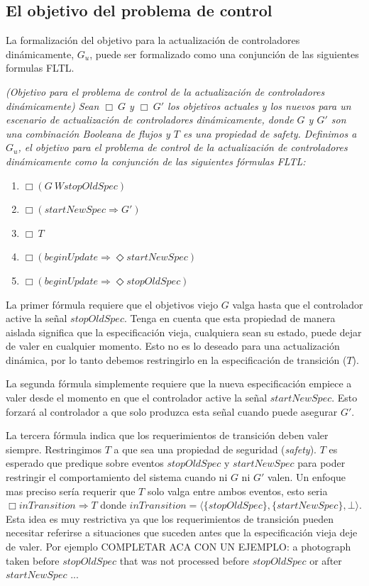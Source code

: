 \subsection{El objetivo del problema de control}

La formalización del objetivo para la actualización de controladores dinámicamente, $G_u$, puede ser formalizado
como una conjunción de las siguientes formulas FLTL.

\begin{nahaDef}
\label{update_goals_def}
\emph{(Objetivo para el problema de control de la actualización de controladores dinámicamente) Sean $\Box\ G$ y $\Box\ G'$
los objetivos actuales y los nuevos para un escenario de actualización de controladores dinámicamente, donde $G$ y $G'$
son una combinación Booleana de flujos y $T$ es una propiedad de safety. Definimos a $G_u$, el objetivo para el
problema de control de la actualización de controladores dinámicamente como la conjunción de las siguientes fórmulas
FLTL:}

\begin{enumerate}
\itemsep-4mm
\item $\Box(G\ W stopOldSpec)$
\item $\Box(startNewSpec \Longrightarrow G')$
\item $\Box\ T$
\item $\Box(beginUpdate \Longrightarrow \Diamond startNewSpec)$
\item $\Box(beginUpdate \Longrightarrow \Diamond stopOldSpec)$
\end{enumerate}
\end{nahaDef}

La primer fórmula requiere que el objetivos viejo $G$ valga hasta que el controlador active la señal $stopOldSpec$.
Tenga en cuenta que esta propiedad de manera aislada significa que la especificación vieja, cualquiera sean su estado,
puede dejar de valer en cualquier momento. Esto no es lo deseado para una actualización dinámica, por lo tanto debemos
restringirlo en la especificación de transición ($T$).

La segunda fórmula simplemente requiere que la nueva especificación empiece a valer desde el momento en que el
controlador active la señal $startNewSpec$. Esto forzará al controlador a que solo produzca esta señal cuando puede
asegurar $G'$.

La tercera fórmula indica que los requerimientos de transición deben valer siempre. Restringimos $T$ a que sea una
propiedad de seguridad (\emph{safety}). $T$ es esperado que predique sobre eventos $stopOldSpec$ y $startNewSpec$ para
poder restringir el comportamiento del sistema cuando ni $G$ ni $G'$ valen. Un enfoque mas preciso sería requerir que
$T$ solo valga entre ambos eventos, esto seria $\Box inTransition \Longrightarrow T$ donde $inTransition =
\langle\{stopOldSpec\},\{startNewSpec\}, \bot\rangle$. Esta idea es muy restrictiva ya que los requerimientos de transición
pueden necesitar referirse a situaciones que suceden antes que la especificación vieja deje de valer. Por ejemplo
COMPLETAR ACA CON UN EJEMPLO: a photograph taken before $stopOldSpec$ that was not processed before $stopOldSpec$ or
after $startNewSpec$ ...

